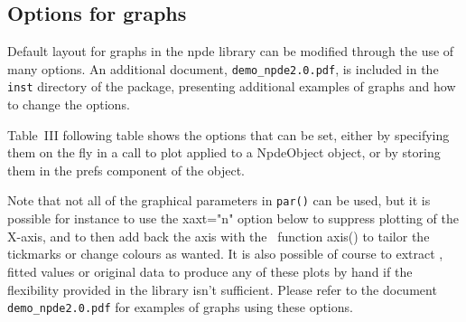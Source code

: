 \subsection{Options for graphs}

\hskip 18pt Default layout for graphs in the {\sf npde} library can be modified through the use of many options. An additional document, \verb+demo_npde2.0.pdf+, is included in the \texttt{inst} directory of the package, presenting additional examples of graphs and how to change the options.

Table~III following table shows the options that can be set, either by specifying them on the fly in a call to plot applied to a NpdeObject object, or by storing them in the {\sf prefs} component of the object.

Note that not all of the graphical parameters in \texttt{par()} can be used, but it is possible for instance to use the {\sf xaxt="n"} option below to suppress plotting of the X-axis, and to then add back the axis with the \R~function {\sf axis()} to tailor the tickmarks or change colours as wanted. It is also possible of course to extract \npde, fitted values or original data to produce any of these plots by hand if the flexibility provided in the library isn't sufficient. Please refer to the document \verb+demo_npde2.0.pdf+ for examples of graphs using these options.

